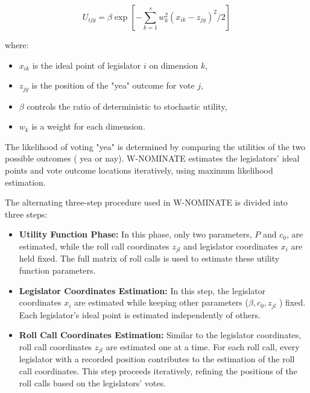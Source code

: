 \documentclass[a4paper,12pt]{report}
\begin{document}
    \[
        U_{ijy} = \beta \exp \left[ -\sum_{k=1}^{s} w_k^2 (x_{ik} - z_{jy})^2 / 2 \right]
    \]

    where:
    \begin{itemize}
        \item \( x_{ik} \) is the ideal point of legislator \(i\) on dimension \(k\),
        \item \( z_{jy} \) is the position of the "yea" outcome for vote \(j\),
        \item \( \beta \) controls the ratio of deterministic to stochastic utility,
        \item \( w_k \) is a weight for each dimension.
    \end{itemize}

    The likelihood of voting "yea" is determined by comparing the utilities of the two possible outcomes (
    yea or nay). W-NOMINATE estimates the legislators' ideal points and vote outcome locations iteratively,
    using maximum likelihood estimation.

    The alternating three-step procedure used in W-NOMINATE is divided into three steps:

    \begin{itemize}
        \item \textbf{Utility Function Phase:} In this phase, only two parameters, \( P \) and \( c_0 \), are estimated,
        while the roll call coordinates \( z_{jl} \) and legislator coordinates \( x_i \)
        are held fixed. The full matrix of roll calls is used to estimate these utility function parameters.

        \item \textbf{Legislator Coordinates Estimation:} In this step, the legislator coordinates \( x_i \) are
        estimated while keeping other parameters (\( \beta, c_0, z_{jl} \)
        ) fixed. Each legislator's ideal point is estimated independently of others.

        \item \textbf{Roll Call Coordinates Estimation:} Similar to the legislator coordinates, roll call coordinates
        \( z_{jl} \)
        are estimated one at a time. For each roll call, every legislator with a recorded position contributes to the
        estimation of the roll call coordinates. This step proceeds iteratively, refining the positions of the roll
        calls based on the legislators' votes.
    \end{itemize}
\end{document}
